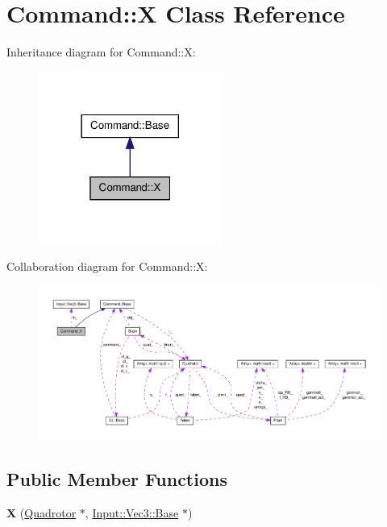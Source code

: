 \hypertarget{classCommand_1_1X}{\section{\-Command\-:\-:\-X \-Class \-Reference}
\label{classCommand_1_1X}
}


\-Inheritance diagram for \-Command\-:\-:\-X\-:\nopagebreak
\begin{figure}[H]
\begin{center}
\leavevmode
\includegraphics[width=170pt]{classCommand_1_1X__inherit__graph}
\end{center}
\end{figure}


\-Collaboration diagram for \-Command\-:\-:\-X\-:\nopagebreak
\begin{figure}[H]
\begin{center}
\leavevmode
\includegraphics[width=350pt]{classCommand_1_1X__coll__graph}
\end{center}
\end{figure}
\subsection*{\-Public \-Member \-Functions}
\begin{DoxyCompactItemize}
\item 
\hypertarget{classCommand_1_1X_a60d599b8edc5db9fc73e8e6239a7bbf9}{{\bfseries \-X} (\hyperlink{classQuadrotor}{\-Quadrotor} $\ast$, \hyperlink{classInput_1_1Vec3_1_1Base}{\-Input\-::\-Vec3\-::\-Base} $\ast$)}\label{classCommand_1_1X_a60d599b8edc5db9fc73e8e6239a7bbf9}

\end{DoxyCompactItemize}
